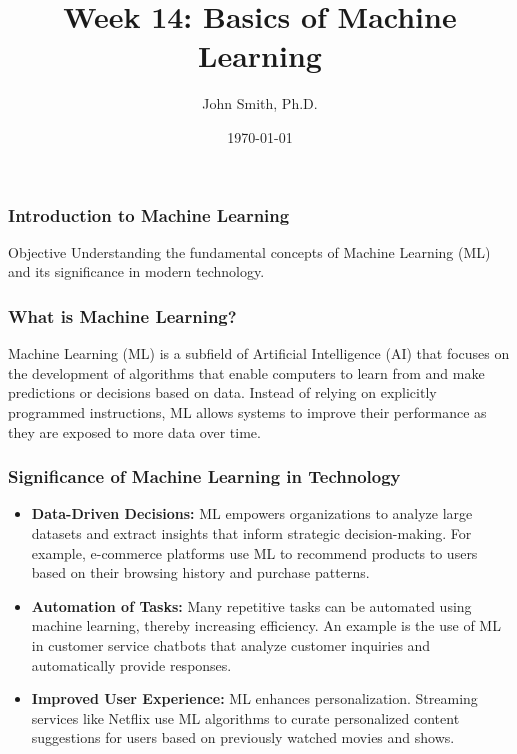 \documentclass[aspectratio=169]{beamer}
\title[Basics of ML]{Week 14: Basics of Machine Learning}
\author[J. Smith]{John Smith, Ph.D.}
\institute[University Name]{
  Department of Computer Science\\
  University Name\\
  \vspace{0.3cm}
  Email: email@university.edu\\
  Website: www.university.edu
}
\date{\today}
\begin{document}
\frame{\titlepage}

\begin{frame}[fragile]
    \frametitle{Introduction to Machine Learning}
    \begin{block}{Objective}
        Understanding the fundamental concepts of Machine Learning (ML) and its significance in modern technology.
    \end{block}
\end{frame}

\begin{frame}[fragile]
    \frametitle{What is Machine Learning?}
    Machine Learning (ML) is a subfield of Artificial Intelligence (AI) that focuses on the development of algorithms that enable computers to learn from and make predictions or decisions based on data. Instead of relying on explicitly programmed instructions, ML allows systems to improve their performance as they are exposed to more data over time.
\end{frame}

\begin{frame}[fragile]
    \frametitle{Significance of Machine Learning in Technology}
    \begin{itemize}
        \item \textbf{Data-Driven Decisions:} ML empowers organizations to analyze large datasets and extract insights that inform strategic decision-making. For example, e-commerce platforms use ML to recommend products to users based on their browsing history and purchase patterns.
        
        \item \textbf{Automation of Tasks:} Many repetitive tasks can be automated using machine learning, thereby increasing efficiency. An example is the use of ML in customer service chatbots that analyze customer inquiries and automatically provide responses.
        
        \item \textbf{Improved User Experience:} ML enhances personalization. Streaming services like Netflix use ML algorithms to curate personalized content suggestions for users based on previously watched movies and shows.
    \end{itemize}
\end{frame}
\end{document}
